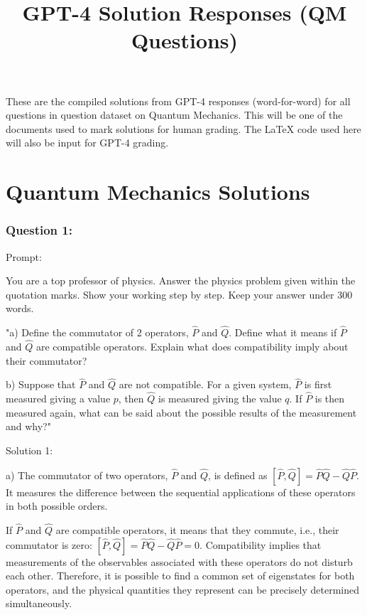 \documentclass[a4paper,11pt]{article}
\begin{document}
\title{GPT-4 Solution Responses (QM Questions)}
\author{}
\date{}
\maketitle

\noindent These are the compiled solutions from GPT-4 responses (word-for-word) for all questions in question dataset on Quantum Mechanics. This will be one of the documents used to mark solutions for human grading. The LaTeX code used here will also be input for GPT-4 grading. 

\section{Quantum Mechanics Solutions}

\subsubsection*{Question 1:}

Prompt:
\begin{spverbatim}
    You are a top professor of physics. Answer the physics problem given within the quotation marks. Show your working step by step. Keep your answer under 300 words.

    "a) Define the commutator of 2 operators, \( \hat{P} \) and \( \hat{Q} \). Define what it means if \( \hat{P} \) and \( \hat{Q} \) are compatible operators. Explain what does compatibility imply about their commutator?

    b) Suppose that \( \hat{P} \) and \( \hat{Q} \) are not compatible. For a given system, \( \hat{P} \) is first measured giving a value \( p \), then \( \hat{Q} \) is measured giving the value \( q \). If \( \hat{P} \) is then measured again, what can be said about the possible results of the measurement and why?"
\end{spverbatim}

\bigskip

\noindent Solution 1: 

a) The commutator of two operators, \( \hat{P} \) and \( \hat{Q} \), is defined as \([ \hat{P}, \hat{Q} ] = \hat{P}\hat{Q} - \hat{Q}\hat{P}\). It measures the difference between the sequential applications of these operators in both possible orders.

If \( \hat{P} \) and \( \hat{Q} \) are compatible operators, it means that they commute, i.e., their commutator is zero: \([ \hat{P}, \hat{Q} ] = \hat{P}\hat{Q} - \hat{Q}\hat{P} = 0\). Compatibility implies that measurements of the observables associated with these operators do not disturb each other. Therefore, it is possible to find a common set of eigenstates for both operators, and the physical quantities they represent can be precisely determined simultaneously.
\end{document}
